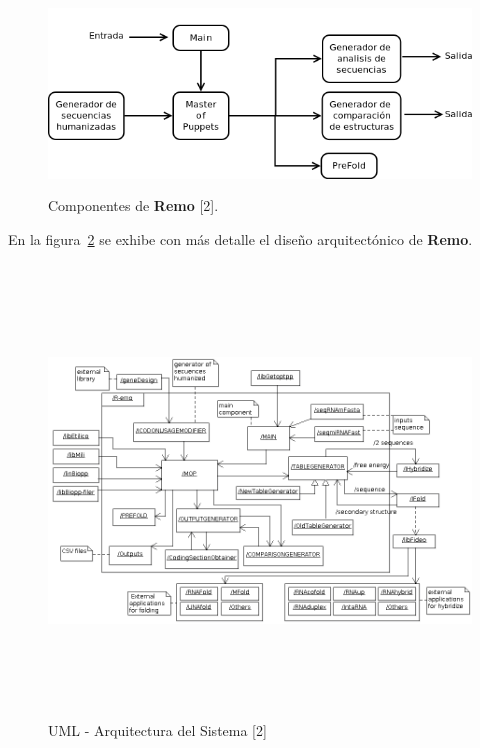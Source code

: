 \begin{figure}[!hbtp]
	\begin{center}
		\hspace*{.6cm}\includegraphics[width=12.5cm, height=5.2cm]{image/componenteRemo.png}
		\caption{Componentes de \textbf{Remo} [2].}
		\label{componentesBasicos}
	\end{center}
\end{figure}

\par En la figura~\ref{arquitecture} se exhibe con más detalle el diseño arquitectónico de \textbf{Remo}.

\begin{figure}[!hbtp]
	\begin{center}
		\includegraphics[width=20cm, height=12cm, angle=90]{image/arquitectura.png}
		\caption{UML - Arquitectura del Sistema [2]} 
		\label{arquitecture}
	\end{center}
\end{figure}

